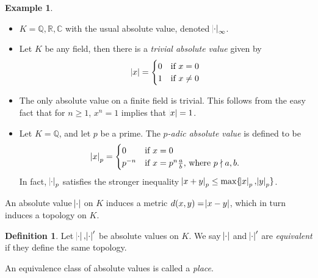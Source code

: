 \documentclass[11pt]{article}
\theoremstyle{definition}
\newtheorem{definition}{Definition}[subsection]
\newtheorem*{example}{Example}
\theoremstyle{plain}
\theoremstyle{remark}
\newcommand{\QQ}{\mathbb{Q}}
\newcommand{\RR}{\mathbb{R}}
\newcommand{\CC}{\mathbb{C}}
\begin{document}
\begin{example}\phantom{}
    \begin{itemize}
        \item $K = \QQ, \RR, \CC$ with the usual absolute value, denoted $\abs{\cdot}_\infty$.
        \item Let $K$ be any field, then there is a \emph{trivial absolute value} given by
            \begin{equation*}
                \abs{x} =
                \begin{cases}
                    0 & \text{if } x = 0 \\
                    1 & \text{if } x \neq 0
                \end{cases}
            \end{equation*}
        \item The only absolute value on a finite field is trivial. This follows from the easy fact that for $n \ge 1$, $x^n = 1$ implies that $\abs{x} = 1$.
        \item Let $K = \QQ$, and let $p$ be a prime. The \emph{$p$-adic absolute value} is defined to be
            \begin{equation*}
                \abs{x}_p =
                \begin{cases}
                    0 & \text{if } x = 0 \\
                    p^{-n} & \text{if } x = p^n \frac{a}{b}\text{, where } p \nmid a, b.
                \end{cases}
            \end{equation*}
            In fact, $\abs{\cdot}_p$ satisfies the stronger inequality $\abs{x + y}_p \le \max\{\abs{x}_p, \abs{y}_p\}$.
    \end{itemize}
\end{example}

\noindent An absolute value $\abs{\cdot}$ on $K$ induces a metric $d(x, y) = \abs{x - y}$, which in turn induces a topology on $K$.

\begin{definition}\label{def:1_2}
    Let $\abs{\cdot}, \abs{\cdot}'$ be absolute values on $K$. We say $\abs{\cdot}$ and $\abs{\cdot}'$ are \emph{equivalent} if they define the same topology.

    An equivalence class of absolute values is called a \emph{place}.
\end{definition}
\end{document}
